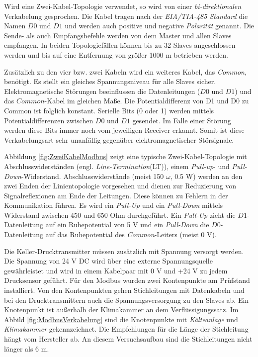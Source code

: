 Wird eine Zwei-Kabel-Topologie verwendet, so wird von einer \textit{bi-direktionalen} Verkabelung gesprochen. Die Kabel tragen nach der \textit{EIA/TIA-485 Standard} die Namen $D0$ und $D1$ und werden auch positive und negative \textit{Polarität} genannt. Die Sende- als auch Empfangsbefehle werden von dem Master und allen Slaves empfangen. In beiden Topologiefällen können bis zu 32 Slaves angeschlossen werden und bis auf eine Entfernung von größer 1000 m betrieben werden. 
 
Zusätzlich zu den vier bzw. zwei Kabeln wird ein weiteres Kabel, das \textit{Common}, benötigt. Es stellt ein gleiches Spannungsniveau für alle Slaves sicher. Elektromagnetische Störungen beeinflussen die Datenleitungen ($D0$ und $D1$) und das $Common$-Kabel im gleichen Maße. Die Potentialdifferenz von D1 und D0 zu Common ist folglich konstant. Serielle Bits (0 oder 1) werden mittels Potentialdifferenzen zwischen $D0$ und $D1$ gesendet. Im Falle einer Störung werden diese Bits immer noch vom jeweiligen Receiver erkannt. Somit ist diese Verkabelungsart sehr unanfällig gegenüber elektromagnetischer Störsignale. 


Abbildung \ref{fig:ZweiKabelModbus} zeigt eine typische Zwei-Kabel-Topologie mit Abschlusswiderständen (engl. \textit{Line-Termination}(LT)), einem \textit{Pull-up}- und \textit{Pull-Down}-Widerstand.  Abschlusswiderstände (meist 150 $\omega$, 0.5 W) werden an den zwei Enden der Linientopologie vorgesehen und dienen zur Reduzierung von Signalreflexionen am Ende der Leitungen. Diese können zu Fehlern in der Kommunikation führen. 
Es wird ein \textit{Pull-Up} und ein \textit{Pull-Down} mittels Widerstand zwischen 450 und 650 Ohm durchgeführt. Ein \textit{Pull-Up} zieht die $D1$-Datenleitung auf ein Ruhepotential von 5 V und ein \textit{Pull-Down} die $D0$-Datenleitung auf das Ruhepotential des \textit{Common}-Leiters (meist 0 V).

Die Keller-Drucktransmitter müssen zusätzlich mit Spannung versorgt werden. Die Spannung von 24 V DC wird über eine externe Spannungsquelle gewährleistet und wird in einem Kabelpaar mit 0 V und +24 V zu jedem Drucksensor geführt. Für den Modbus wurden zwei Kontenpunkte am Prüfstand installiert. Von den Kontenpunkten gehen Stichleitungen mit Datenkabeln und bei den Drucktransmittern auch die Spannungsversorgung zu den Slaves ab. Ein Knotenpunkt ist außerhalb der Klimakammer an dem Verflüssigungssatz. Im Abbild \ref{fig:ModbusVerkabelung} sind die Knotenpunkte mit \textit{Kälteanlage} und \textit{Klimakammer} gekennzeichnet. Die Empfehlungen für die Länge der Stichleitung hängt vom Hersteller ab. An diesem Versuchsaufbau sind die Stichleitungen nicht länger als 6 m. 

